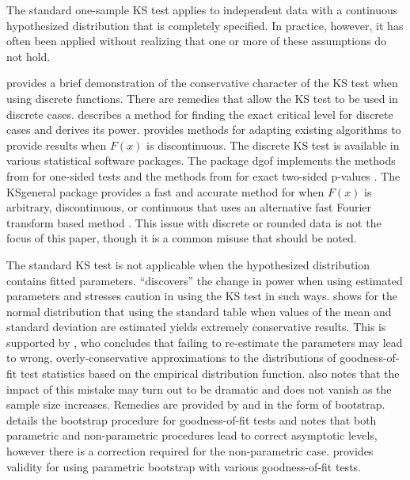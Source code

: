 \documentclass[12pt, letterpaper, titlepage]{article}
\begin{document}
The standard one-sample KS test applies to independent data with a continuous
hypothesized distribution that is completely specified. In practice, however, it
has often been applied without realizing that one or more of these assumptions
do not hold.

\citet{Noether} provides a brief demonstration of the 
conservative character of the KS test when using discrete functions. 
There are remedies that allow the KS test to be used in discrete cases. 
\citet{Conover} describes a method for finding the exact critical level for 
discrete cases and derives its power. \citet{Gleser} provides methods for 
adapting existing algorithms to provide results when $F(x)$ is discontinuous.
The discrete KS test is available in various statistical software packages.
The package \textsf{dgof} implements the methods from \citet{Conover} for 
one-sided tests and the methods from \citet{Gleser} for exact two-sided 
p-values \citep{Arnold}. The \textsf{KSgeneral} package provides a fast and 
accurate method for when $F(x)$ is arbitrary, discontinuous, or continuous that 
uses an alternative fast Fourier transform based method \citep{Dimitrova}.
This issue with discrete or rounded data is not the focus of this paper, though
 it is a
common misuse that should be noted.


The standard KS test is not applicable when the hypothesized distribution 
contains fitted parameters. \citet{Steinskog} ``discovers'' the change in power 
when using estimated parameters and stresses caution in using the KS test in 
such ways. \citet{Lilliefors} shows for the normal distribution that using the 
standard table when values of the mean and standard deviation are estimated 
yields extremely conservative results. This is supported by \citet{Capasso}, 
who concludes that failing to re-estimate the parameters may lead to wrong, 
overly-conservative approximations to the distributions of goodness-of-fit test 
statistics based on the empirical distribution function. \citet{Capasso} also 
notes that the impact of this mistake may turn out to be dramatic and does not 
vanish as the sample size increases. Remedies are provided by \citet{Babu} and 
\citet{Genest} in the form of bootstrap. \citet{Babu} details the bootstrap
procedure for goodness-of-fit tests and notes that both parametric and 
non-parametric procedures lead to correct asymptotic levels, however there is a 
correction required for the non-parametric case. \citet{Genest} provides 
validity for using parametric bootstrap with various goodness-of-fit tests.
\end{document}
